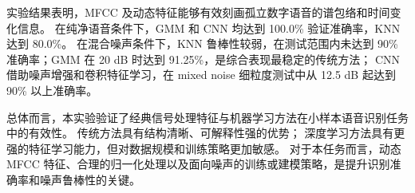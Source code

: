 实验结果表明，MFCC 及动态特征能够有效刻画孤立数字语音的谱包络和时间变化信息。
在纯净语音条件下，GMM 和 CNN 均达到 100.0\% 验证准确率，KNN 达到 80.0\%。
在混合噪声条件下，KNN 鲁棒性较弱，在测试范围内未达到 90\% 准确率；GMM 在 20 dB 时达到 91.25\%，是综合表现最稳定的传统方法；
CNN 借助噪声增强和卷积特征学习，在 mixed noise 细粒度测试中从 12.5 dB 起达到 90\% 以上准确率。

总体而言，本实验验证了经典信号处理特征与机器学习方法在小样本语音识别任务中的有效性。
传统方法具有结构清晰、可解释性强的优势；
深度学习方法具有更强的特征学习能力，但对数据规模和训练策略更加敏感。
对于本任务而言，动态 MFCC 特征、合理的归一化处理以及面向噪声的训练或建模策略，是提升识别准确率和噪声鲁棒性的关键。
